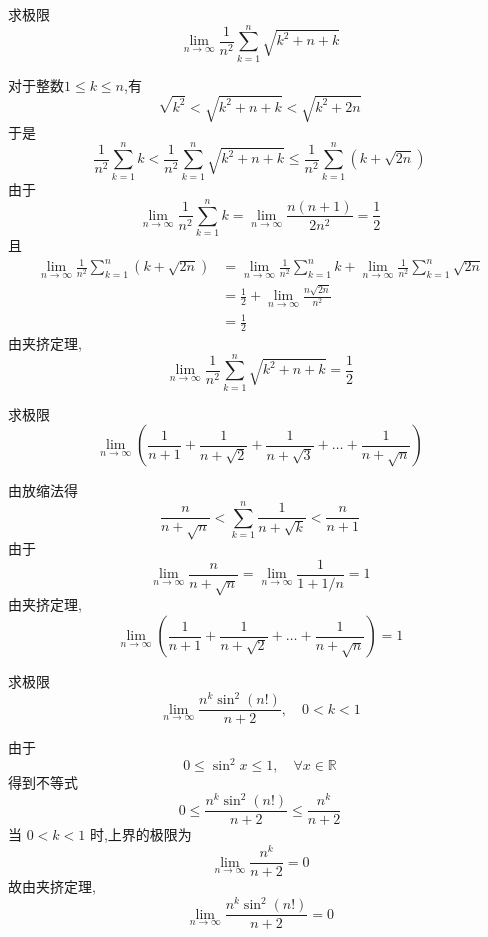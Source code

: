 \begin{questions}
    \question 求极限
    \[
    \lim_{n \to \infty} \frac{1}{n^2} \sum_{k=1}^{n} \sqrt{k^2+n+k}
    \]
    \begin{solution}
        对于整数$1 \le k \le n$,有
        \[
        \sqrt{k^2} < \sqrt{k^2+n+k} < \sqrt{k^2+2n}
        \]
        于是
        \[
        \frac{1}{n^2} \sum_{k=1}^{n} k < \frac{1}{n^2} \sum_{k=1}^{n} \sqrt{k^2+n+k} \le \frac{1}{n^2} \sum_{k=1}^{n} (k+\sqrt{2n})
        \]
        由于
        \[
        \lim_{n \to \infty} \frac{1}{n^2} \sum_{k=1}^{n} k = \lim_{n \to \infty} \frac{n(n+1)}{2n^2} = \frac{1}{2}
        \]
        且
        \begin{align*}
        \lim_{n \to \infty} \frac{1}{n^2} \sum_{k=1}^{n} (k+\sqrt{2n}) &= \lim_{n \to \infty} \frac{1}{n^2} \sum_{k=1}^{n} k + \lim_{n \to \infty} \frac{1}{n^2} \sum_{k=1}^{n} \sqrt{2n} \\
        &= \frac{1}{2} + \lim_{n \to \infty} \frac{n \sqrt{2n}}{n^2} \\
        &= \frac{1}{2}
        \end{align*}
        由夹挤定理,
        \[
        \lim_{n \to \infty} \frac{1}{n^2} \sum_{k=1}^{n} \sqrt{k^2+n+k} = \frac{1}{2}
        \]
    \end{solution}

    \question 求极限
    \[\lim_{n \to \infty} \left(\frac{1}{n+1} + \frac{1}{n+\sqrt{2}} + \frac{1}{n+\sqrt{3}} + \dots + \frac{1}{n+\sqrt{n}}\right)\]
    \begin{solution}
        由放缩法得
        \[
        \frac{n}{n+\sqrt{n}} < \sum_{k=1}^{n} \frac{1}{n+\sqrt{k}} < \frac{n}{n+1}
        \]
        由于
        \[
        \lim_{n \to \infty} \frac{n}{n+\sqrt{n}} = \lim_{n \to \infty} \frac{1}{1 + 1/n} = 1
        \]
        由夹挤定理,
        \[
        \lim_{n \to \infty} \left(\frac{1}{n+1} + \frac{1}{n+\sqrt{2}} + \dots + \frac{1}{n+\sqrt{n}}\right) = 1
        \]
    \end{solution}

    \question 求极限
    \[
    \lim_{n \to \infty} \frac{n^k \sin^2(n!)}{n+2}, \quad 0<k<1
    \]
    \begin{solution}
        由于 
        \[
        0 \le \sin^2 x \le 1, \quad \forall x \in \mathbb{R}
        \]
        得到不等式
        \[
        0 \le \frac{n^k \sin^2(n!)}{n+2} \le \frac{n^k}{n+2}
        \]
        当 $0<k<1$ 时,上界的极限为
        \[
        \lim_{n \to \infty} \frac{n^k}{n+2} = 0
        \]
        故由夹挤定理,
        \[
        \lim_{n \to \infty} \frac{n^k \sin^2(n!)}{n+2} = 0
        \]
    \end{solution}


\end{questions}
